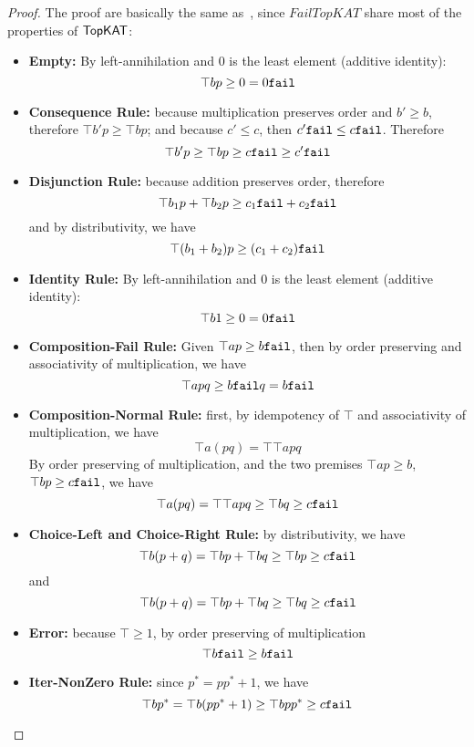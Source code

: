 \begin{proof}

    The proof are basically the same as~,
    since \(FailTopKAT\) share most of the properties of \(\mathsf{TopKAT}\):
    \begin{itemize}
        \item \textbf{Empty:}
            By left-annihilation and \(0\) is the least element (additive identity):
            \[\top b p \geq 0 = 0 \mathtt{fail}\]
        \item \textbf{Consequence Rule:}
            because multiplication preserves order
            and \(b' \geq b\), therefore \(\top b' p \geq \top b p\);
            and because \(c' \leq c\), then \(c' \mathtt{fail} \leq c \mathtt{fail}\).
            Therefore
            \[\top b' p \geq \top b p \geq c \mathtt{fail} \geq c' \mathtt{fail}\]
        \item \textbf{Disjunction Rule:}
            because addition preserves order, therefore
            \[\top b_1 p + \top b_2 p \geq c_1 \mathtt{fail} + c_2 \mathtt{fail}\]
            and by distributivity, we have
            \[\top (b_1 + b_2) p \geq (c_1 + c_2) \mathtt{fail}\]
        \item \textbf{Identity Rule:}
            By left-annihilation and \(0\) is the least element (additive identity):
            \[\top b 1 \geq 0 = 0 \mathtt{fail}\]
        \item \textbf{Composition-Fail Rule:}
            Given \(\top a p \geq b \mathtt{fail}\),
            then by order preserving and associativity of multiplication,
            we have
            \[\top a p q \geq b \mathtt{fail} q = b \mathtt{fail}\]
        \item \textbf{Composition-Normal Rule:}
            first, by idempotency of \(\top\)
            and associativity of multiplication, we have
            \[\top a (p q) = \top \top a p q\]
            By order preserving of multiplication,
            and the two premises \(\top a p \geq b\), \(\top b p \geq c \mathtt{fail}\),
            we have \[\top a (p q) = \top \top a p q \geq \top b q \geq c \mathtt{fail}\]
        \item \textbf{Choice-Left and Choice-Right Rule:}
            by distributivity, we have
            \[\top b (p + q)
            = \top b p + \top b q
            \geq \top b p \geq c \mathtt{fail}\]
            and
            \[\top b (p + q)
            = \top b p + \top b q
            \geq \top b q \geq c \mathtt{fail}\]
        \item \textbf{Error:}
            because \(\top \geq 1\), by order preserving of multiplication
            \[\top b \mathtt{fail} \geq b \mathtt{fail}\]
        \item \textbf{Iter-NonZero Rule:}
            since \({p}^* = p {p}^* + 1\),
            we have
            \[\top b {p}^*
            = \top b (p {p}^* + 1)
            \geq \top b p {p}^* \geq c \mathtt{fail}\]
    \end{itemize}


\end{proof}
